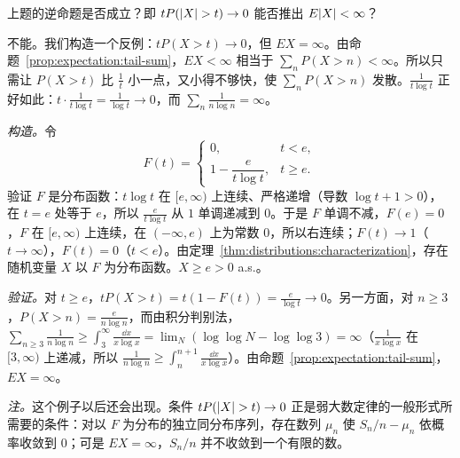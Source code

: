 \begin{workedexample}\label{we:expectation:tP-converse}
上题的逆命题是否成立？即 $tP(\lvert X\rvert>t)\to0$ 能否推出 $E\lvert X\rvert<\infty$？
\end{workedexample}
\begin{solution}
不能。我们构造一个反例：$tP(X>t)\to0$，但 $EX=\infty$。由命题~\ref{prop:expectation:tail-sum}，$EX<\infty$ 相当于 $\sum_nP(X>n)<\infty$。所以只需让 $P(X>t)$ 比 $\frac1t$ 小一点，又小得不够快，使 $\sum_nP(X>n)$ 发散。$\frac1{t\log t}$ 正好如此：$t\cdot\frac1{t\log t}=\frac1{\log t}\to0$，而 $\sum_n\frac1{n\log n}=\infty$。

\emph{构造。}令
\[
F(t)=\begin{cases}0,&t<e,\\ 1-\dfrac e{t\log t},&t\geqslant e.\end{cases}
\]
验证 $F$ 是分布函数：$t\log t$ 在 $[e,\infty)$ 上连续、严格递增（导数 $\log t+1>0$），在 $t=e$ 处等于 $e$，所以 $\frac e{t\log t}$ 从 $1$ 单调递减到 $0$。于是 $F$ 单调不减，$F(e)=0$，$F$ 在 $[e,\infty)$ 上连续，在 $(-\infty,e)$ 上为常数 $0$，所以右连续；$F(t)\to1$（$t\to\infty$），$F(t)=0$（$t<e$）。由定理~\ref{thm:distributions:characterization}，存在随机变量 $X$ 以 $F$ 为分布函数。$X\geqslant e>0$ a.s.。

\emph{验证。}对 $t\geqslant e$，$tP(X>t)=t(1-F(t))=\frac e{\log t}\to0$。另一方面，对 $n\geqslant3$，$P(X>n)=\frac e{n\log n}$，而由积分判别法，$\sum_{n\geqslant3}\frac1{n\log n}\geqslant\int_3^\infty\frac{\dd x}{x\log x}=\lim_N(\log\log N-\log\log3)=\infty$（$\frac1{x\log x}$ 在 $[3,\infty)$ 上递减，所以 $\frac1{n\log n}\geqslant\int_n^{n+1}\frac{\dd x}{x\log x}$）。由命题~\ref{prop:expectation:tail-sum}，$EX=\infty$。

\emph{注。}这个例子以后还会出现。条件 $tP(\lvert X\rvert>t)\to0$ 正是弱大数定律的一般形式所需要的条件：对以 $F$ 为分布的独立同分布序列，存在数列 $\mu_n$ 使 $S_n/n-\mu_n$ 依概率收敛到 $0$；可是 $EX=\infty$，$S_n/n$ 并不收敛到一个有限的数。
\end{solution}

